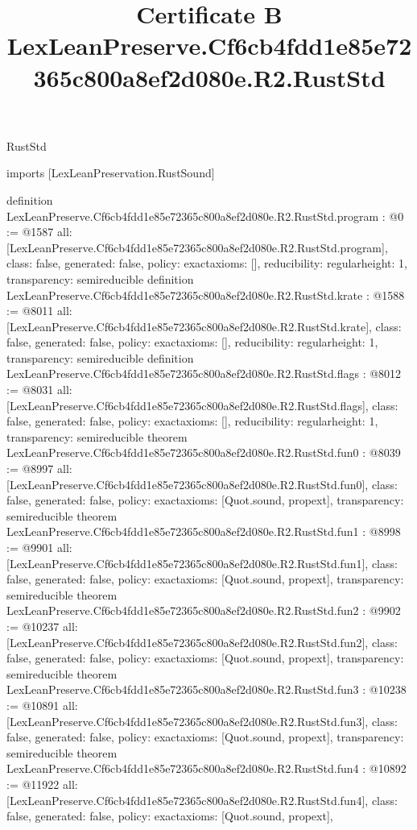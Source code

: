 \begin{lexlean}{RustStd}
\title{Certificate B LexLeanPreserve.Cf6cb4fdd1e85e72365c800a8ef2d080e.R2.RustStd}
\begin{coremodule}
imports [LexLeanPreservation.RustSound]

definition LexLeanPreserve.Cf6cb4fdd1e85e72365c800a8ef2d080e.R2.RustStd.program : @0 := @1587 {
  all: [LexLeanPreserve.Cf6cb4fdd1e85e72365c800a8ef2d080e.R2.RustStd.program],
  class: false,
  generated: false,
  policy: exact{axioms: []},
  reducibility: regular{height: 1},
  transparency: semireducible
}
definition LexLeanPreserve.Cf6cb4fdd1e85e72365c800a8ef2d080e.R2.RustStd.krate : @1588 := @8011 {
  all: [LexLeanPreserve.Cf6cb4fdd1e85e72365c800a8ef2d080e.R2.RustStd.krate],
  class: false,
  generated: false,
  policy: exact{axioms: []},
  reducibility: regular{height: 1},
  transparency: semireducible
}
definition LexLeanPreserve.Cf6cb4fdd1e85e72365c800a8ef2d080e.R2.RustStd.flags : @8012 := @8031 {
  all: [LexLeanPreserve.Cf6cb4fdd1e85e72365c800a8ef2d080e.R2.RustStd.flags],
  class: false,
  generated: false,
  policy: exact{axioms: []},
  reducibility: regular{height: 1},
  transparency: semireducible
}
theorem LexLeanPreserve.Cf6cb4fdd1e85e72365c800a8ef2d080e.R2.RustStd.fun0 : @8039 := @8997 {
  all: [LexLeanPreserve.Cf6cb4fdd1e85e72365c800a8ef2d080e.R2.RustStd.fun0],
  class: false,
  generated: false,
  policy: exact{axioms: [Quot.sound, propext]},
  transparency: semireducible
}
theorem LexLeanPreserve.Cf6cb4fdd1e85e72365c800a8ef2d080e.R2.RustStd.fun1 : @8998 := @9901 {
  all: [LexLeanPreserve.Cf6cb4fdd1e85e72365c800a8ef2d080e.R2.RustStd.fun1],
  class: false,
  generated: false,
  policy: exact{axioms: [Quot.sound, propext]},
  transparency: semireducible
}
theorem LexLeanPreserve.Cf6cb4fdd1e85e72365c800a8ef2d080e.R2.RustStd.fun2 : @9902 := @10237 {
  all: [LexLeanPreserve.Cf6cb4fdd1e85e72365c800a8ef2d080e.R2.RustStd.fun2],
  class: false,
  generated: false,
  policy: exact{axioms: [Quot.sound, propext]},
  transparency: semireducible
}
theorem LexLeanPreserve.Cf6cb4fdd1e85e72365c800a8ef2d080e.R2.RustStd.fun3 : @10238 := @10891 {
  all: [LexLeanPreserve.Cf6cb4fdd1e85e72365c800a8ef2d080e.R2.RustStd.fun3],
  class: false,
  generated: false,
  policy: exact{axioms: [Quot.sound, propext]},
  transparency: semireducible
}
theorem LexLeanPreserve.Cf6cb4fdd1e85e72365c800a8ef2d080e.R2.RustStd.fun4 : @10892 := @11922 {
  all: [LexLeanPreserve.Cf6cb4fdd1e85e72365c800a8ef2d080e.R2.RustStd.fun4],
  class: false,
  generated: false,
  policy: exact{axioms: [Quot.sound, propext]},
}
\end{coremodule}
\end{lexlean}
